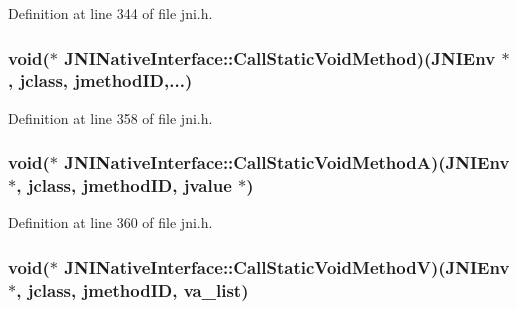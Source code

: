 Definition at line 344 of file jni.\-h.

\hypertarget{struct_j_n_i_native_interface_a03189adad3a801c6f8d962b65e14deee}{
\subsubsection[{Call\-Static\-Void\-Method}]{\setlength{\rightskip}{0pt plus 5cm}void($\ast$ J\-N\-I\-Native\-Interface\-::\-Call\-Static\-Void\-Method)({\bf J\-N\-I\-Env} $\ast$, {\bf jclass}, {\bf jmethod\-I\-D},...)}}\label{struct_j_n_i_native_interface_a03189adad3a801c6f8d962b65e14deee}


Definition at line 358 of file jni.\-h.

\hypertarget{struct_j_n_i_native_interface_a9ccb4453470e89917c201eebfeea1eb6}{
\subsubsection[{Call\-Static\-Void\-Method\-A}]{\setlength{\rightskip}{0pt plus 5cm}void($\ast$ J\-N\-I\-Native\-Interface\-::\-Call\-Static\-Void\-Method\-A)({\bf J\-N\-I\-Env} $\ast$, {\bf jclass}, {\bf jmethod\-I\-D}, {\bf jvalue} $\ast$)}}\label{struct_j_n_i_native_interface_a9ccb4453470e89917c201eebfeea1eb6}


Definition at line 360 of file jni.\-h.

\hypertarget{struct_j_n_i_native_interface_afc53c63f5064e00d3aa70470f0123d3c}{
\subsubsection[{Call\-Static\-Void\-Method\-V}]{\setlength{\rightskip}{0pt plus 5cm}void($\ast$ J\-N\-I\-Native\-Interface\-::\-Call\-Static\-Void\-Method\-V)({\bf J\-N\-I\-Env} $\ast$, {\bf jclass}, {\bf jmethod\-I\-D}, va\-\_\-list)}}\label{struct_j_n_i_native_interface_afc53c63f5064e00d3aa70470f0123d3c}


